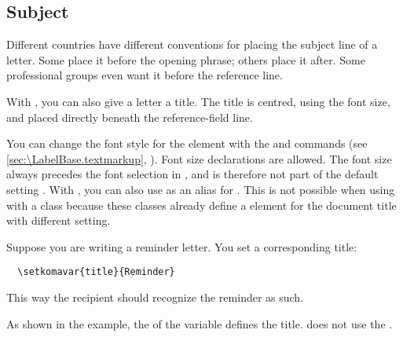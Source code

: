 \subsection{Subject}
%
\BeginIndexGroup
{}

Different countries have different conventions for placing the subject line of
a letter. Some place it before the opening phrase; others place it after. Some
professional groups even want it before the reference line.


\begin{Declaration}
\end{Declaration}
With \KOMAScript{}, you can also give a letter a title. The title
is centred, using the  font size, and placed directly beneath the
reference-field line.

%
%
You can change the font style for the
 element with
the  and
 commands (see
\autoref{sec:\LabelBase.textmarkup},
). Font size declarations are
allowed. The  font size always precedes the font selection in
\KOMAScript{}, and is therefore not part of the default setting
\linebreak[2]%
\linebreak[2]%
. With ,
you can also use  as an
alias for . This is not possible when using
 with a \KOMAScript{} class because these classes already
define a  element for the document title with different
setting.%
%
%
\begin{Example}
  Suppose you are writing a reminder letter. You set a corresponding title:
\begin{lstlisting}
  \setkomavar{title}{Reminder}
\end{lstlisting}
  This way the recipient should recognize the reminder as such.
\end{Example}
As shown in the example, the  of the variable defines the
title. \KOMAScript{} does not use the .%
%
\EndIndexGroup


